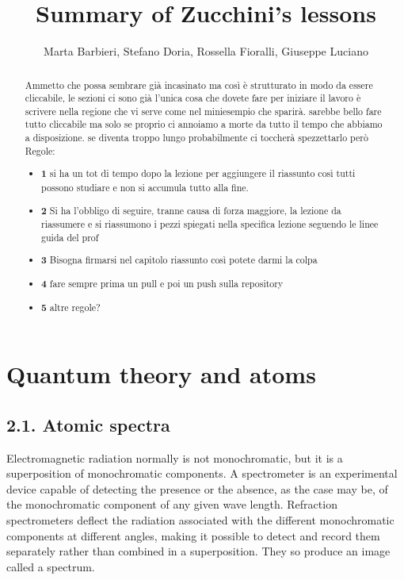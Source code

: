 \documentclass{article}
\title{Summary of Zucchini’s lessons}
\author{Marta Barbieri, Stefano Doria, Rossella Fioralli, Giuseppe Luciano}
\begin{document}
\maketitle
\begin{abstract}
    Ammetto che possa sembrare già incasinato ma così è strutturato in modo da essere cliccabile, le sezioni ci sono già l'unica cosa che dovete fare per iniziare il lavoro è scrivere nella regione che vi serve come nel miniesempio che sparirà. sarebbe bello fare tutto cliccabile ma solo se proprio ci annoiamo a morte da tutto il tempo che abbiamo a disposizione. se diventa troppo lungo probabilmente ci toccherà spezzettarlo però
    Regole:
    \begin{itemize}
\item \textbf{1} 
 si ha un tot di tempo dopo la lezione per aggiungere il riassunto così tutti possono studiare e non si accumula tutto alla fine. 
 
\item \textbf{2} 
Si ha l'obbligo di seguire, tranne causa di forza maggiore, la lezione da riassumere e si riassumono i pezzi spiegati nella specifica lezione seguendo le linee guida del prof 
\item \textbf{3}
Bisogna firmarsi nel capitolo riassunto così potete darmi la colpa
\item \textbf{4}
fare sempre prima un pull e poi un push sulla repository
\item \textbf{5}
altre regole?
\end{itemize}
   
\end{abstract}

\tableofcontents
\section*{Quantum theory and atoms}
\subsection*{2.1. Atomic spectra}

Electromagnetic radiation normally is not monochromatic, but it is a superposition of monochromatic components. A spectrometer is an experimental device capable of detecting the presence or the absence, as the case may be, of the monochromatic component of any given wave length. Refraction spectrometers deflect the radiation associated with the different monochromatic components at different angles, making it possible to detect and record them separately rather than combined in a superposition. They so produce an image called a spectrum.
\end{document}
